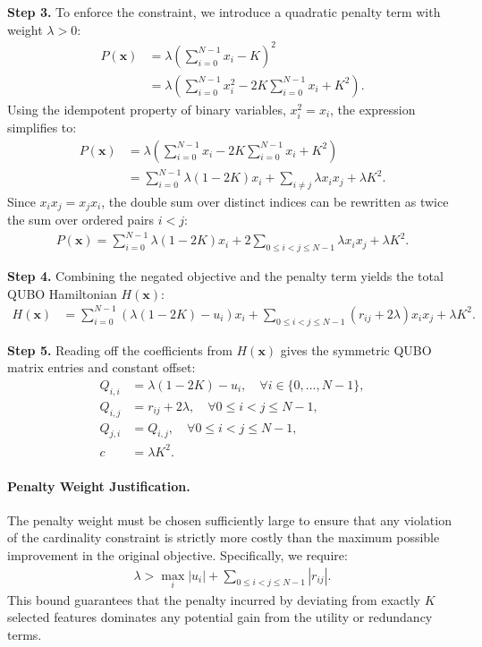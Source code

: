 \documentclass[12pt]{article}
\begin{document}
\textbf{Step 3.} To enforce the constraint, we introduce a quadratic penalty term with weight $\lambda > 0$:
\begin{align}
P(\mathbf{x}) &= \lambda \left( \sum_{i=0}^{N-1} x_i - K \right)^2 \\
&= \lambda \left( \sum_{i=0}^{N-1} x_i^2 - 2K \sum_{i=0}^{N-1} x_i + K^2 \right).
\end{align}
Using the idempotent property of binary variables, $x_i^2 = x_i$, the expression simplifies to:
\begin{align}
P(\mathbf{x}) &= \lambda \left( \sum_{i=0}^{N-1} x_i - 2K \sum_{i=0}^{N-1} x_i + K^2 \right) \\
&= \sum_{i=0}^{N-1} \lambda(1-2K)x_i + \sum_{i \neq j} \lambda x_i x_j + \lambda K^2.
\end{align}
Since $x_i x_j = x_j x_i$, the double sum over distinct indices can be rewritten as twice the sum over ordered pairs $i < j$:
\begin{align}
P(\mathbf{x}) = \sum_{i=0}^{N-1} \lambda(1-2K)x_i + 2 \sum_{0 \le i < j \le N-1} \lambda x_i x_j + \lambda K^2.
\end{align}

\textbf{Step 4.} Combining the negated objective and the penalty term yields the total QUBO Hamiltonian $H(\mathbf{x})$:
\begin{align}
H(\mathbf{x}) &= \sum_{i=0}^{N-1} \left( \lambda(1-2K) - u_i \right) x_i + \sum_{0 \le i < j \le N-1} \left( r_{ij} + 2\lambda \right) x_i x_j + \lambda K^2.
\end{align}

\textbf{Step 5.} Reading off the coefficients from $H(\mathbf{x})$ gives the symmetric QUBO matrix entries and constant offset:
\begin{align}
Q_{i,i} &= \lambda(1-2K) - u_i, \quad \forall i \in \{0, \dots, N-1\}, \\
Q_{i,j} &= r_{ij} + 2\lambda, \quad \forall 0 \le i < j \le N-1, \\
Q_{j,i} &= Q_{i,j}, \quad \forall 0 \le i < j \le N-1, \\
c &= \lambda K^2.
\end{align}

\paragraph{Penalty Weight Justification.}
The penalty weight must be chosen sufficiently large to ensure that any violation of the cardinality constraint is strictly more costly than the maximum possible improvement in the original objective. Specifically, we require:
\begin{align}
\lambda > \max_{i} |u_i| + \sum_{0 \le i < j \le N-1} |r_{ij}|.
\end{align}
This bound guarantees that the penalty incurred by deviating from exactly $K$ selected features dominates any potential gain from the utility or redundancy terms.
\end{document}
